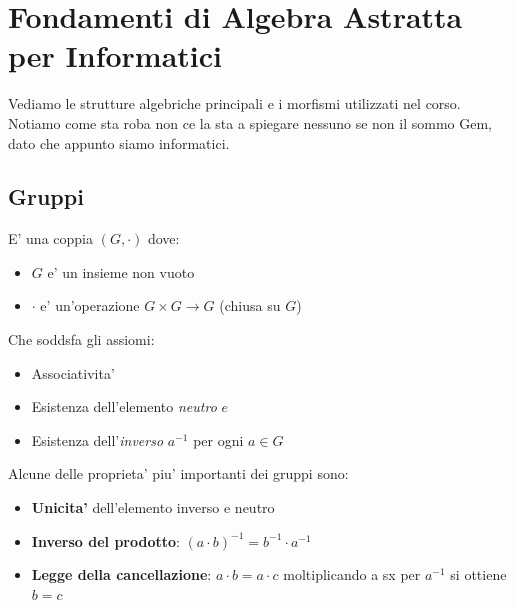 % 
\chapter{Fondamenti di Algebra Astratta per Informatici}
Vediamo le strutture algebriche principali e i morfismi utilizzati nel corso. Notiamo come sta roba non ce la sta a spiegare nessuno se non il sommo Gem, dato che appunto siamo informatici.
\section{Gruppi}
{
  E' una coppia $ (G, \cdot) $ dove:
  \begin{itemize}
  \item $ G $ e' un insieme non vuoto
  \item $ \cdot $ e' un'operazione $ G \times G \to G $ (chiusa su $ G $)
  \end{itemize}

  Che soddsfa gli assiomi:
  \begin{itemize}
  \item Associativita'
  \item Esistenza dell'elemento \textit{neutro} $e$
  \item Esistenza dell'\textit{inverso} $a^{-1}$ per ogni $ a \in G $
  \end{itemize}
}

Alcune delle proprieta' piu' importanti dei gruppi sono:
\begin{itemize}
\item \textbf{Unicita'} dell'elemento inverso e neutro
\item \textbf{Inverso del prodotto}: $ (a \cdot b)^{-1} = b^{-1} \cdot a^{-1} $
\item \textbf{Legge della cancellazione}: $ a \cdot b = a \cdot c $ moltiplicando a sx per $ a^{-1} $ si ottiene
  $ b = c $
\end{itemize}


